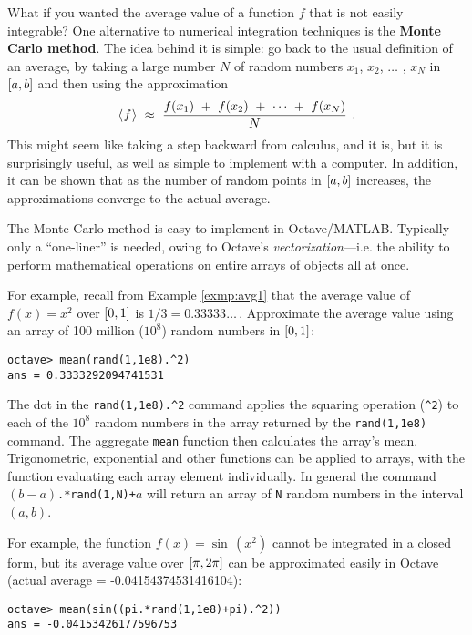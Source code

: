 What if you wanted the average value of a function $f$ that is not easily
integrable? One alternative to numerical integration techniques is the
\textbf{Monte Carlo method}. The idea behind it is
simple: go back to the usual definition of an average, by taking a large
number $N$ of random numbers $x_1$, $x_2$, $\ldots$ , $x_N$ in
$\lbrack a,b \rbrack$ and then using the approximation
\[
\langle\mspace{1mu}f\mspace{1mu}\rangle ~\approx~ \frac{f(x_1) ~+~ f(x_2) ~+~ \cdots ~+~ f(x_N)}{N} ~.
\]
This might seem like taking a step backward from calculus, and it is, but it is
surprisingly useful, as well as simple to implement with a computer. In addition,
it can be shown that as the number of random points in $\lbrack a,b \rbrack$ increases,
the approximations converge to the actual average.
\newpage
\begin{exmp}\label{exmp:avgoctave}
\noindent The Monte Carlo method is easy to implement in Octave/MATLAB.
Typically only a ``one-liner'' is needed, owing to Octave's
\emph{vectorization}---i.e. the ability to perform mathematical operations on
entire arrays of objects all at once.\vspace{2mm}

\par\noindent For example, recall from Example \ref{exmp:avg1} that the average
value of $f(x)=x^2$ over $\lbrack 0,1 \rbrack$ is $1/3 = 0.33333\ldots\,$. Approximate
the average value using an array of 100 million ($10^8$) random numbers in
$\lbrack 0,1 \rbrack$:
\begin{Verbatim}[frame=single, framesep=2mm]
octave> mean(rand(1,1e8).^2)
ans = 0.3333292094741531
\end{Verbatim}
\noindent The dot in the \texttt{rand(1,1e8).\textasciicircum2} command applies
the squaring operation (\texttt{\textasciicircum 2}) to each of the $10^8$
random numbers in the array returned by the \texttt{rand(1,1e8)} command. The
aggregate \texttt{mean} function then calculates the array's mean.
Trigonometric, exponential and other functions can be applied to arrays, with
the function evaluating each array element individually. In general the
command \texttt{$(b-a)$.*rand(1,N)+$a$} will return an array of \texttt{N}
random numbers in the interval $(a,b)$.\vspace{2mm}

\noindent For example, the function $f(x)=\sin\,(x^2)$ cannot be integrated in a
closed form, but its average value over $\lbrack \pi,2\pi \rbrack$ can be
approximated easily in Octave (actual average = -0.04154374531416104):
\begin{Verbatim}[frame=single, framesep=2mm]
octave> mean(sin((pi.*rand(1,1e8)+pi).^2))
ans = -0.04153426177596753
\end{Verbatim}
\end{exmp}\vspace{-2mm}
